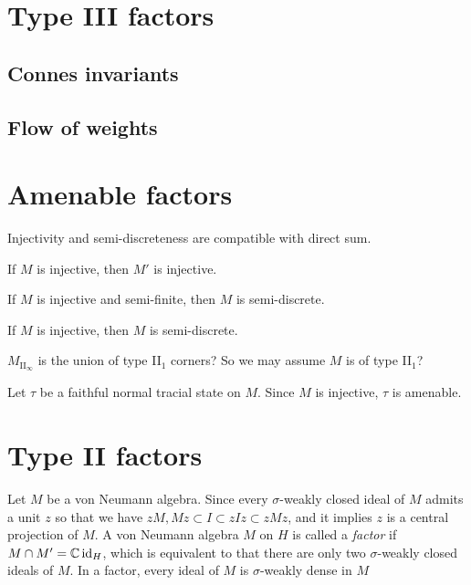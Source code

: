 \documentclass{../../large}
\begin{document}
\chapter{Type III factors}
\section{Connes invariants}

\section{Flow of weights}



\chapter{Amenable factors}

Injectivity and semi-discreteness are compatible with direct sum.

\begin{prb}
\begin{parts}
\item If $M$ is injective, then $M'$ is injective.
\item If $M$ is injective and semi-finite, then $M$ is semi-discrete.
\item If $M$ is injective, then $M$ is semi-discrete.
\end{parts}
\end{prb}
\begin{pf}
$M_{\mathrm{II}_\infty}$ is the union of type II$_1$ corners?
So we may assume $M$ is of type II$_1$?

Let $\tau$ be a faithful normal tracial state on $M$.
Since $M$ is injective, $\tau$ is amenable.
\end{pf}

\chapter{Type II factors}

\begin{prb}
Let $M$ be a von Neumann algebra.
Since every $\sigma$-weakly closed ideal of $M$ admits a unit $z$ so that we have $zM,Mz\subset I\subset zIz\subset zMz$, and it implies $z$ is a central projection of $M$.
A von Neumann algebra $M$ on $H$ is called a \emph{factor} if $M\cap M'=\mathbb{C}\operatorname{id}_H$, which is equivalent to that there are only two $\sigma$-weakly closed ideals of $M$.
In a factor, every ideal of $M$ is $\sigma$-weakly dense in $M$
\end{prb}
\end{document}
